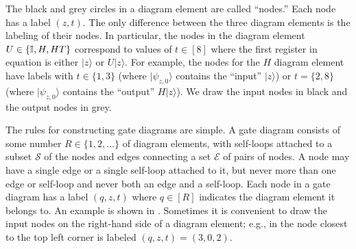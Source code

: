 \documentclass[../thesis-main/thesis-main]{subfiles}
\begin{document}
The black and grey circles in a diagram element are called ``nodes.'' Each node has a label $(z,t)$. The only difference between the three diagram elements is the labeling of their nodes. In particular, the nodes in the diagram element $U\in\{\mathbb{I},H,HT\}$ correspond to values of $t\in[8]$ where the first register in equation  is either $|z\rangle$ or $U|z\rangle$. For example, the nodes for the $H$ diagram element have labels with $t\in\{1,3\}$ (where $|\psi_{z,0}\rangle$ contains the ``input'' $|z\rangle$) or $t=\{2,8\}$ (where $|\psi_{z,0}\rangle$ contains the ``output'' $H|z\rangle$). We draw the input nodes in black and the output nodes in grey.

The rules for constructing gate diagrams are simple. A gate diagram consists of some number $R \in \{1,2,\ldots\}$ of diagram elements, with self-loops attached to a subset $\mathcal{S}$ of the nodes and edges connecting a set $\mathcal{E}$ of pairs of nodes. A node may have a single edge or a single self-loop attached to it, but never more than one edge or self-loop and never both an edge and a self-loop. Each node in a gate diagram has a label $(q,z,t)$ where $q \in [R]$ indicates the diagram element it belongs to. An example is shown in .
Sometimes it is convenient to draw the input nodes on the right-hand side of a diagram element; e.g., in  the node closest to the top left corner is labeled $(q,z,t)=(3,0,2)$.

\end{document}
